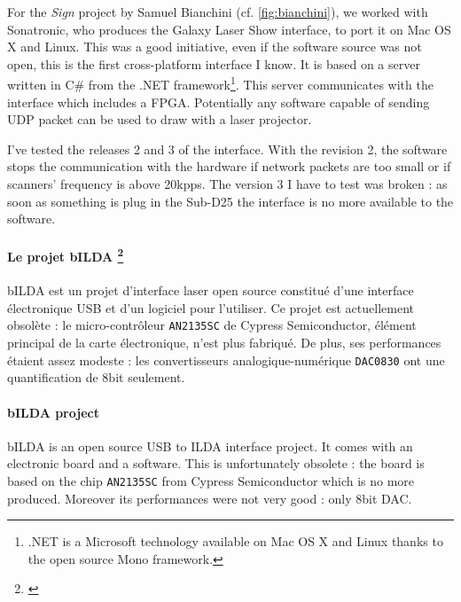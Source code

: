 \begin{en}
For the \textit{Sign} project by Samuel Bianchini (cf. \ref{fig:bianchini}), we worked with Sonatronic, who produces the Galaxy Laser Show interface, to port it on Mac OS X and Linux.
This was a good initiative, even if the software source was not open, this is the first cross-platform interface I know.
It is based on a server written in C\# from the .NET framework\footnote{.NET is a Microsoft technology available on Mac OS X and Linux thanks to the open source Mono framework.}.
This server communicates with the interface which includes a FPGA.
Potentially any software capable of sending UDP packet can be used to draw with a laser projector.

I've tested the releases 2 and 3 of the interface.
With the revision 2, the software stops the communication with the hardware if network packets are too small or if scanners' frequency is above 20\unit{kpps}.
The version 3 I have to test was broken : as soon as something is plug in the Sub-D25 the interface is no more available to the software.
\end{en}

\begin{fr}
\paragraph*{Le projet bILDA \footnote{\url{}}}
bILDA est un projet d'interface laser open source constitué d'une interface électronique USB et d'un logiciel pour l'utiliser.
Ce projet est actuellement obsolète : le micro-contrôleur \texttt{AN2135SC} de Cypress Semiconductor, élément principal de la carte électronique, n'est plus fabriqué.
De plus, ses performances étaient assez modeste : les convertisseurs analogique-numérique \texttt{DAC0830} ont une quantification de 8\unit{bit} seulement.
\end{fr}

\begin{en}
\paragraph*{bILDA project}
bILDA is an open source USB to ILDA interface project.
It comes with an electronic board and a software.
This is unfortunately obsolete : the board is based on the chip \texttt{AN2135SC} from Cypress Semiconductor which is no more produced.
Moreover its performances were not very good : only 8\unit{bit} DAC.
\end{en}

